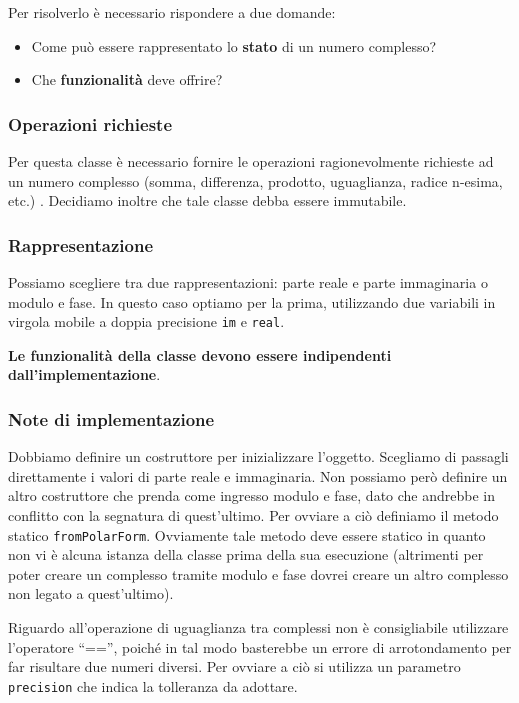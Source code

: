 \documentclass{article}
\begin{document}
Per risolverlo è necessario rispondere a due domande:
\begin{itemize}
\item Come può essere rappresentato lo \textbf{stato} di un numero complesso?
\item Che \textbf{funzionalità} deve offrire?
\end{itemize}

\subsubsection{Operazioni richieste}

Per questa classe è necessario fornire le operazioni
ragionevolmente richieste ad un numero complesso
(somma, differenza, prodotto, uguaglianza, radice n-esima, etc.) .
Decidiamo inoltre che tale classe debba essere immutabile.

\subsubsection{Rappresentazione}

Possiamo scegliere tra due rappresentazioni:
parte reale e parte immaginaria o modulo e fase.
In questo caso optiamo per la prima,
utilizzando due variabili in virgola mobile a doppia precisione
\texttt{im} e \texttt{real}.

\textbf{Le funzionalità della classe devono essere indipendenti dall'implementazione}.

\subsubsection{Note di implementazione}

Dobbiamo definire un costruttore per inizializzare l'oggetto.
Scegliamo di passagli direttamente i valori di parte reale e immaginaria.
Non possiamo però definire un altro costruttore che prenda come ingresso
modulo e fase, dato che andrebbe in conflitto con la segnatura di quest'ultimo.
Per ovviare a ciò definiamo il metodo statico \texttt{fromPolarForm}.
Ovviamente tale metodo deve essere statico in quanto non vi è
alcuna istanza della classe prima della sua esecuzione (altrimenti
per poter creare un complesso tramite modulo e fase dovrei creare un altro complesso
non legato a quest'ultimo).

Riguardo all'operazione di uguaglianza tra complessi non è consigliabile
utilizzare l'operatore ``=='', poiché in tal modo basterebbe un errore
di arrotondamento per far risultare due numeri diversi.
Per ovviare a ciò si utilizza un parametro \texttt{precision} che indica la tolleranza da
adottare.
\end{document}
